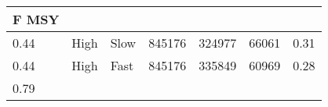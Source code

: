 \documentclass[]{article}
\begin{document}
\begin{longtable}[]{@{}lllllll@{}}
\begin{minipage}[b]{0.07\columnwidth}
F MSY\strut
\end{minipage}\tabularnewline
\midrule
\endhead
\begin{minipage}[t]{0.07\columnwidth}\raggedright\strut
0.44\strut
\end{minipage} & \begin{minipage}[t]{0.07\columnwidth}\raggedright\strut
High\strut
\end{minipage} & \begin{minipage}[t]{0.07\columnwidth}\raggedright\strut
Slow\strut
\end{minipage} & \begin{minipage}[t]{0.07\columnwidth}\raggedright\strut
845176\strut
\end{minipage} & \begin{minipage}[t]{0.07\columnwidth}\raggedright\strut
324977\strut
\end{minipage} & \begin{minipage}[t]{0.07\columnwidth}\raggedright\strut
66061\strut
\end{minipage} & \begin{minipage}[t]{0.07\columnwidth}\raggedright\strut
0.31\strut
\end{minipage}\tabularnewline
\begin{minipage}[t]{0.07\columnwidth}\raggedright\strut
0.44\strut
\end{minipage} & \begin{minipage}[t]{0.07\columnwidth}\raggedright\strut
High\strut
\end{minipage} & \begin{minipage}[t]{0.07\columnwidth}\raggedright\strut
Fast\strut
\end{minipage} & \begin{minipage}[t]{0.07\columnwidth}\raggedright\strut
845176\strut
\end{minipage} & \begin{minipage}[t]{0.07\columnwidth}\raggedright\strut
335849\strut
\end{minipage} & \begin{minipage}[t]{0.07\columnwidth}\raggedright\strut
60969\strut
\end{minipage} & \begin{minipage}[t]{0.07\columnwidth}\raggedright\strut
0.28\strut
\end{minipage}\tabularnewline
\begin{minipage}[t]{0.07\columnwidth}\raggedright\strut
0.79\strut
\end{minipage} & \begin{minipage}[t]{0.07\columnwidth}\raggedright\strut

\end{minipage}
\end{longtable}
\end{document}
